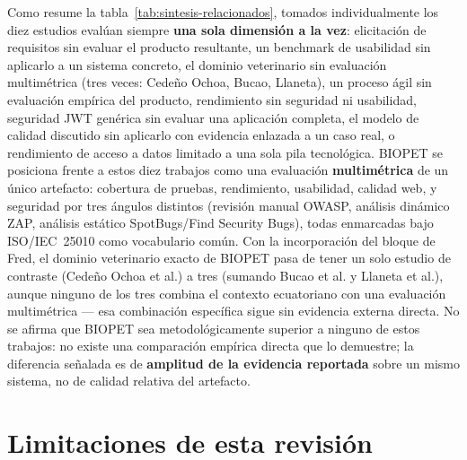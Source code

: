Como resume la tabla~\ref{tab:sintesis-relacionados}, tomados
individualmente los diez estudios eval\'uan siempre \textbf{una
sola dimensi\'on a la vez}: elicitaci\'on de requisitos sin evaluar el
producto resultante, un benchmark de usabilidad sin aplicarlo a un sistema
concreto, el dominio veterinario sin evaluaci\'on multim\'etrica (tres
veces: Cede\~no Ochoa, Bucao, Llaneta), un proceso \'agil sin evaluaci\'on
emp\'irica del producto, rendimiento sin seguridad ni usabilidad, seguridad
JWT gen\'erica sin evaluar una aplicaci\'on completa, el modelo de calidad
discutido sin aplicarlo con evidencia enlazada a un caso real, o
rendimiento de acceso a datos limitado a una sola pila tecnol\'ogica.
BIOPET se posiciona frente a estos diez trabajos como una evaluaci\'on
\textbf{multim\'etrica} de un \'unico artefacto: cobertura de pruebas,
rendimiento, usabilidad, calidad web, y seguridad por tres \'angulos
distintos (revisi\'on manual OWASP, an\'alisis din\'amico ZAP, an\'alisis
est\'atico SpotBugs/Find Security Bugs), todas enmarcadas bajo
ISO/IEC~25010 como vocabulario com\'un. Con la incorporaci\'on del bloque
de Fred, el dominio veterinario exacto de BIOPET pasa de tener un solo
estudio de contraste (Cede\~no Ochoa et al.) a tres (sumando Bucao et al. y
Llaneta et al.), aunque ninguno de los tres combina el contexto
ecuatoriano con una evaluaci\'on multim\'etrica --- esa combinaci\'on
espec\'ifica sigue sin evidencia externa directa. No se afirma que BIOPET
sea metodol\'ogicamente superior a ninguno de estos trabajos: no existe una
comparaci\'on emp\'irica directa que lo demuestre; la diferencia se\~nalada
es de \textbf{amplitud de la evidencia reportada} sobre un mismo sistema,
no de calidad relativa del artefacto.

\section{Limitaciones de esta revisi\'on}
\label{sec:limitaciones-trabajos-relacionados}

